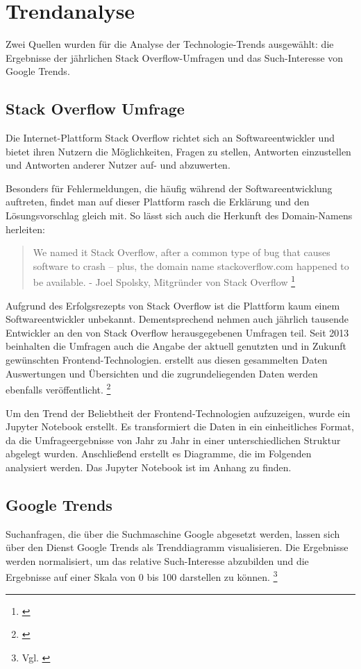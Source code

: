 \section{Trendanalyse}
\label{sec:Trendanalyse}


Zwei Quellen wurden für die Analyse der Technologie-Trends ausgewählt: die Ergebnisse der jährlichen Stack Overflow-Umfragen und das Such-Interesse von Google Trends.

\subsection{Stack Overflow Umfrage}
Die Internet-Plattform Stack Overflow richtet sich an Softwareentwickler und bietet ihren Nutzern die Möglichkeiten, Fragen zu stellen, Antworten einzustellen und Antworten anderer Nutzer auf- und abzuwerten.

Besonders für Fehlermeldungen, die häufig während der Softwareentwicklung auftreten, findet man auf dieser Plattform rasch die Erklärung und den Lösungsvorschlag gleich mit.
So lässt sich auch die Herkunft des Domain-Namens herleiten:

\begin{quotation}
We named it Stack Overflow, after a common type of bug that causes software to crash -- plus, the domain name stackoverflow.com happened to be available. - Joel Spolsky, Mitgründer von Stack Overflow \footnote{\cite{TheUnprovenPath}}
\end{quotation}

Aufgrund des Erfolgsrezepts von Stack Overflow ist die Plattform kaum einem Softwareentwickler unbekannt.
Dementsprechend nehmen auch jährlich tausende Entwickler an den von Stack Overflow herausgegebenen Umfragen teil.
Seit  2013 beinhalten die Umfragen auch die Angabe der aktuell genutzten und in Zukunft gewünschten Frontend-Technologien.
 erstellt aus diesen gesammelten Daten Auswertungen und Übersichten und die zugrundeliegenden Daten werden ebenfalls veröffentlicht.
\footnote{\cite{StackOverflowInsights}} 

Um den Trend der Beliebtheit der Frontend-Technologien aufzuzeigen, wurde ein Jupyter Notebook erstellt.
Es transformiert die Daten in ein einheitliches Format, da die  Umfrageergebnisse von Jahr zu Jahr in einer unterschiedlichen Struktur abgelegt wurden.
Anschließend erstellt es Diagramme, die im Folgenden analysiert werden.
Das Jupyter Notebook ist im  Anhang zu finden.

\subsection{Google Trends} Suchanfragen, die über die Suchmaschine Google abgesetzt werden, lassen sich  über den Dienst Google Trends  als Trenddiagramm visualisieren.
Die Ergebnisse werden normalisiert, um das relative Such-Interesse abzubilden und die Ergebnisse auf einer Skala von 0 bis 100 darstellen zu können.
\footnote{Vgl. \cite{GoogleTrendsHilfe}}

